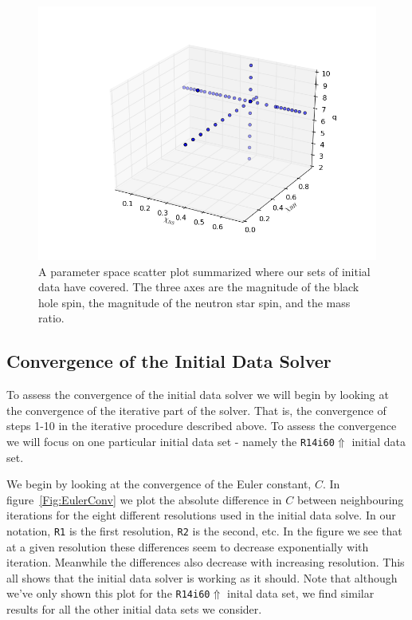 \begin{figure}
\includegraphics[width=0.95\columnwidth]{chap4/3dparam.png}
\caption[3d parameter space plot of Bh-Ns initial data sets.]{\label{fig:3dparam}
A parameter space scatter plot summarized where our sets of initial data have covered. The three axes are the magnitude of the black hole spin, the magnitude of the neutron star spin, and the mass ratio.}
\end{figure}

\subsection{Convergence of the Initial Data Solver}
To assess the convergence of the initial data solver we will begin by looking at the convergence of the iterative part of the solver. That is, the convergence of steps 1-10 in the iterative procedure
described above. To assess the convergence we will focus on one particular initial data set - namely the {\tt R14i60$\Uparrow$} initial data set. 

We begin by looking at the convergence of the Euler constant, $C$. In figure~\ref{Fig:EulerConv} we plot the absolute difference in $C$ between neighbouring iterations for the eight
different resolutions used in the initial data solve. In our notation, {\tt R1} is the first resolution, {\tt R2} is the second, etc. In the figure we see that at a given resolution these differences
seem to decrease exponentially with iteration. Meanwhile the differences also decrease with increasing resolution. This all shows that the initial data solver is working as it should. Note that although we've only shown
this plot for the {\tt R14i60$\Uparrow$} inital data set, we find similar results for all the other initial data sets we consider.


